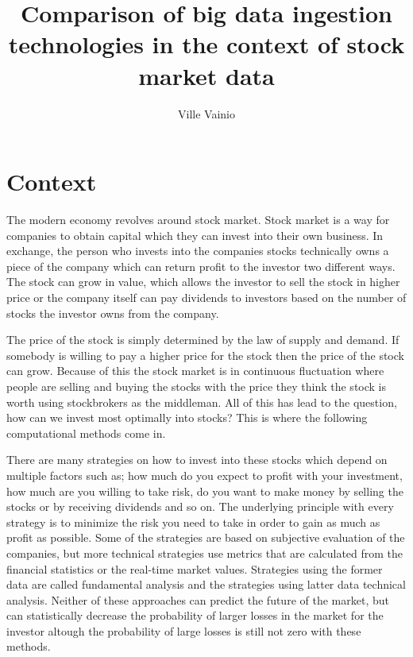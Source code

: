 \documentclass[article,11pt]{article}
\title{Comparison of big data ingestion technologies in the context of stock market data}
\begin{document}
\author{Ville Vainio}
\maketitle

\section{Context}

The modern economy revolves around stock market.
Stock market is a way for companies to obtain capital which they can invest into their own business.
In exchange, the person who invests into the companies stocks technically owns a piece of the company which can return profit to the investor two different ways.
The stock can grow in value, which allows the investor to sell the stock in higher price or the company itself can pay dividends to investors based on the number of stocks the investor owns from the company.

The price of the stock is simply determined by the law of supply and demand. 
If somebody is willing to pay a higher price for the stock then the price of the stock can grow.
Because of this the stock market is in continuous fluctuation where people are selling and buying the stocks with the price they think the stock is worth using stockbrokers as the middleman. \cite{person}
All of this has lead to the question, how can we invest most optimally into stocks?
This is where the following computational methods come in. 

There are many strategies on how to invest into these stocks which depend on multiple factors such as; how much do you expect to profit with your investment, how much are you willing to take risk, do you want to make money by selling the stocks or by receiving dividends and so on.
The underlying principle with every strategy is to minimize the risk you need to take in order to gain as much as profit as possible.
Some of the strategies are based on subjective evaluation of the companies, but more technical strategies use metrics that are calculated from the financial statistics or the real-time market values.
Strategies using the former data are called fundamental analysis and the strategies using latter data technical analysis.
Neither of these approaches can predict the future of the market, but can statistically decrease the probability of larger losses in the market for the investor altough the probability of large losses is still not zero with these methods. \cite{fox}
\end{document}
